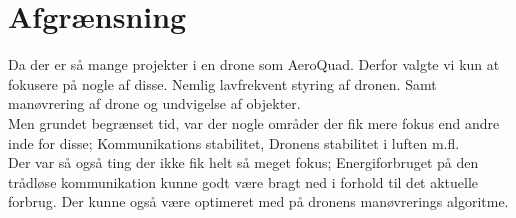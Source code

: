\documentclass[Main]{subfiles}
\begin{document}
\section{Afgrænsning}
Da der er så mange projekter i en drone som AeroQuad. Derfor valgte vi kun at fokusere på nogle af disse. Nemlig lavfrekvent styring af dronen. Samt manøvrering af drone og undvigelse af objekter. 
\\Men grundet begrænset tid, var der nogle områder der fik mere fokus end andre inde for disse; Kommunikations stabilitet, Dronens stabilitet i luften  m.fl. 
\\Der var så også ting der ikke fik helt så meget fokus; Energiforbruget på den trådløse kommunikation kunne godt være bragt ned i forhold til det aktuelle forbrug. Der kunne også være optimeret med på dronens manøvrerings algoritme.
\end{document}
